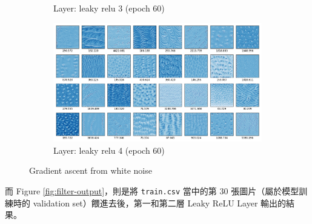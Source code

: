 \documentclass[12pt,a4paper]{extarticle}
\begin{document}
\begin{enumerate}
\begin{figure}[H]
\begin{subfigure}[t]{0.5\textwidth}
      \caption{Layer: leaky relu 3 (epoch 60)}
      \label{fig:leaky_relu_3_e60}
    \end{subfigure}
    \begin{subfigure}[t]{0.5\textwidth}
      \centering
      \includegraphics[width=\linewidth]{images/leaky_re_lu_4_e60.png}
      \caption{Layer: leaky relu 4 (epoch 60)}
      \label{fig:leaky_relu_4_e60}
    \end{subfigure}
    \caption{Gradient ascent from white noise}
    \label{fig:ga-white-noise}
  \end{figure}

  \par 而 Figure \ref{fig:filter-output}，則是將 \texttt{train.csv} 當中的第 30 張圖片（屬於模型訓練時的 validation set）餵進去後，第一和第二層 Leaky ReLU Layer 輸出的結果。


\end{enumerate}
\end{document}
